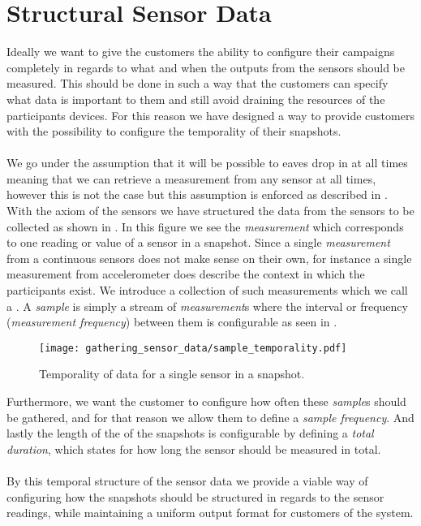 \section{Structural Sensor Data}
\label{sec:structural_sensor_data}

Ideally we want to give the customers the ability to configure their campaigns completely in regards to what and when the outputs from the sensors should be measured. This should be done in such a way that the customers can specify what data is important to them and still avoid draining the resources of the participants devices. For this reason we have designed a way to provide customers with the possibility to configure the temporality of their snapshots. 
\\\\
We go under the assumption that it will be possible to eaves drop in at all times meaning that we can retrieve a measurement from any sensor at all times, however this is not the case but this assumption is enforced as described in . With the axiom of the sensors we have structured the data from the sensors to be collected as shown in . In this figure we see the \emph{measurement} which corresponds to one reading or value of a sensor in a snapshot. Since a single \emph{measurement} from a continuous sensors does not make sense on their own, for instance a single measurement from accelerometer does describe the context in which the participants exist. We introduce a collection of such measurements which we call a . A \emph{sample} is simply a stream of \emph{measurement}s where the interval or frequency (\emph{measurement frequency}) between them is configurable as seen in .

\begin{figure}[!htbp]
    \centering
    \texttt{[image: gathering\_sensor\_data/sample\_temporality.pdf]}
    \caption{Temporality of data for a single sensor in a snapshot.}
    \label{fig:sample_temporality}
\end{figure}
\FloatBarrier

Furthermore, we want the customer to configure how often these \emph{sample}s should be gathered, and for that reason we allow them to define a \emph{sample frequency}. And lastly the length of the of the snapshots is configurable by defining a \emph{total duration}, which states for how long the sensor should be measured in total.
\\\\
By this temporal structure of the sensor data we provide a viable way of configuring how the snapshots should be structured in regards to the sensor readings, while maintaining a uniform output format for customers of the system.

